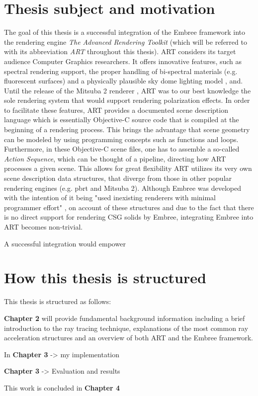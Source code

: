 \section*{Thesis subject and motivation}
The goal of this thesis is a successful integration of the Embree framework into the rendering engine \emph{The Advanced Rendering Toolkit} \cite{artSoftware} (which will be referred to with its abbreviation \emph{ART} throughout this thesis). ART considers its target audience Computer Graphics researchers. It offers innovative features, such as spectral rendering support, the proper handling of bi-spectral materials (e.g. fluorescent surfaces) and a physically plausible sky dome lighting model \cite{wilkie2013predicting}, and. Until the release of the Mitsuba 2 renderer \cite{nimier2019mitsuba}, ART was to our best knowledge the sole rendering system that would support rendering polarization effects.  
In order to facilitate these features, ART provides a documented scene description language which is essentially Objective-C source code that is compiled at the beginning of a rendering process. This brings the advantage that scene geometry can be modeled by using programming concepts  such as functions and loops. Furthermore, in these Objective-C scene files, one has to assemble a so-called \emph{Action Sequence}, which can be thought of a pipeline, directing how ART processes a given scene. This allows for great flexibility  ART utilizes its very own scene description data structures, that diverge from those in other popular rendering engines (e.g. pbrt \cite{pharr2016physically} and Mitsuba 2).
Although Embree was developed with the intention of it being "used inexisting renderers with minimal programmer effort" \cite[p 1]{wald2014embree}, on account of these structures and due to the fact that there is no direct support for rendering CSG solids by Embree, integrating Embree into ART becomes non-trivial. 

A successful integration would empower 


\section*{How this thesis is structured}

This thesis is structured as follows: 

\textbf{Chapter 2} will provide fundamental background information including a brief introduction to the ray tracing technique, explanations of the most common ray acceleration structures and an overview of both ART and the Embree framework.

In \textbf{Chapter 3}  -> my implementation

\textbf{Chapter 3} -> Evaluation and results

This work is concluded in \textbf{Chapter 4}